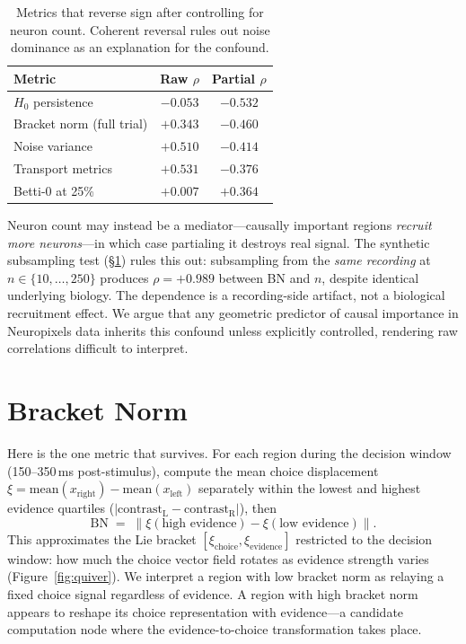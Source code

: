 \documentclass{article}
\begin{document}
\begin{table}[t]
\centering
\caption{Metrics that reverse sign after controlling for neuron count. Coherent reversal rules out noise dominance as an explanation for the confound.}
\label{tab:signflip}
\begin{tabular}{lcc}
\toprule
Metric & Raw $\rho$ & Partial $\rho$ \\
\midrule
$H_0$ persistence & $-0.053$ & $-0.532$ \\
Bracket norm (full trial) & $+0.343$ & $-0.460$ \\
Noise variance & $+0.510$ & $-0.414$ \\
Transport metrics & $+0.531$ & $-0.376$ \\
Betti-0 at 25\% & $+0.007$ & $+0.364$ \\
\bottomrule
\end{tabular}
\end{table}

Neuron count may instead be a mediator---causally important regions \emph{recruit more neurons}---in which case partialing it destroys real signal. The synthetic subsampling test (\S\ref{sec:bracket}) rules this out: subsampling from the \emph{same recording} at $n \in \{10, \ldots, 250\}$ produces $\rho = +0.989$ between BN and $n$, despite identical underlying biology. The dependence is a recording-side artifact, not a biological recruitment effect. We argue that any geometric predictor of causal importance in Neuropixels data inherits this confound unless explicitly controlled, rendering raw correlations difficult to interpret.

\section{Bracket Norm}
\label{sec:bracket}

Here is the one metric that survives. For each region during the decision window (150--350\,ms post-stimulus), compute the mean choice displacement $\xi = \text{mean}(x_{\text{right}}) - \text{mean}(x_{\text{left}})$ separately within the lowest and highest evidence quartiles ($|\text{contrast}_{\text{L}} - \text{contrast}_{\text{R}}|$), then
\begin{equation}
\text{BN} \;=\; \bigl\lVert \xi(\text{high evidence}) - \xi(\text{low evidence}) \bigr\rVert .
\end{equation}
This approximates the Lie bracket $[\xi_{\text{choice}}, \xi_{\text{evidence}}]$ restricted to the decision window: how much the choice vector field rotates as evidence strength varies (Figure~\ref{fig:quiver}). We interpret a region with low bracket norm as relaying a fixed choice signal regardless of evidence. A region with high bracket norm appears to reshape its choice representation with evidence---a candidate computation node where the evidence-to-choice transformation takes place.
\end{document}
